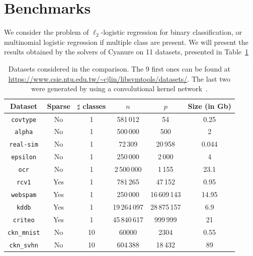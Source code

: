 \documentclass{article}
\begin{document}
\section{Benchmarks}
We consider the problem of $\ell_2$-logistic regression for binary
classification, or multinomial logistic regression if multiple class are
present. We will present the results obtained by the solvers of Cyanure on 11
datasets, presented in Table~\ref{tab:datasets}
\begin{table}[hbtp!]
   \centering
\begin{tabular}{|c|c|c|c|c|c|}
   \hline
   Dataset & Sparse & $\sharp$ classes & $n$ & $p$ & Size (in Gb) \\
   \hline
   \texttt{covtype} & No & 1 & 581\,012 & 54 & 0.25 \\
   \hline
   \texttt{alpha} & No & 1 & 500\,000 & 500 & 2 \\
   \hline
   \texttt{real-sim} & No & 1 & 72\,309 & 20\,958 & 0.044 \\
   \hline
   \texttt{epsilon} & No & 1 & 250\,000 & 2\,000 & 4 \\
   \hline
   \texttt{ocr} & No & 1 & 2\,500\,000 & 1\,155 & 23.1 \\
   \hline
   \texttt{rcv1} & Yes & 1 & 781\,265 & 47\,152 & 0.95 \\
   \hline
   \texttt{webspam} & Yes & 1 & 250\,000 & 16\,609\,143  & 14.95  \\
   \hline
   \texttt{kddb} & Yes & 1 & 19\,264\,097 & 28\,875\,157 & 6.9 \\
   \hline
   \texttt{criteo} & Yes & 1 & 45\,840\,617 & 999\,999 & 21 \\
   \hline
   \texttt{ckn\_mnist} & No & 10 & 60000 & 2304 & 0.55 \\
   \hline
   \texttt{ckn\_svhn} & No & 10 & 604\,388 & 18\,432 & 89 \\
   \hline
\end{tabular} \caption{Datasets considered in the comparison. The 9 first ones can be found at \url{https://www.csie.ntu.edu.tw/~cjlin/libsvmtools/datasets/}. The last two were generated by using a convolutional kernel network~\cite{mairal2016end}. } \label{tab:datasets}
\end{table}
\end{document}
